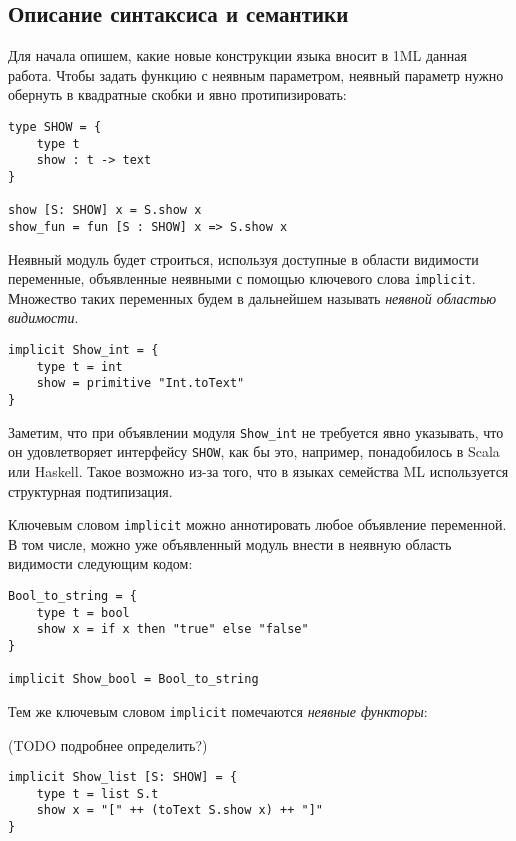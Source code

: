 \documentclass[../diploma.tex]{subfiles}
\begin{document}
\label{sec:1}

\subsection{Описание синтаксиса и семантики}

Для начала опишем, какие новые конструкции языка вносит в 1ML данная работа. Чтобы задать функцию с неявным параметром, неявный параметр нужно обернуть в квадратные скобки и явно протипизировать:

\begin{verbatim}
type SHOW = {
    type t
    show : t -> text
}

show [S: SHOW] x = S.show x
show_fun = fun [S : SHOW] x => S.show x
\end{verbatim}

Неявный модуль будет строиться, используя доступные в области видимости переменные, объявленные неявными с помощью ключевого слова \texttt{implicit}. Множество таких переменных будем в дальнейшем называть \textit{неявной областью видимости}.

\begin{verbatim}
implicit Show_int = {
    type t = int
    show = primitive "Int.toText"
}
\end{verbatim}

Заметим, что при объявлении модуля \texttt{Show\_int} не требуется явно указывать, что он удовлетворяет интерфейсу \texttt{SHOW}, как бы это, например, понадобилось в Scala или Haskell. Такое возможно из-за того, что в языках семейства ML используется структурная подтипизация.

Ключевым словом \texttt{implicit} можно аннотировать любое объявление переменной. В том числе, можно уже объявленный модуль внести в неявную область видимости следующим кодом:

\begin{verbatim}
Bool_to_string = {
    type t = bool
    show x = if x then "true" else "false"
}

implicit Show_bool = Bool_to_string
\end{verbatim}

Тем же ключевым словом \texttt{implicit} помечаются \textit{неявные функторы}:

(TODO подробнее определить?)

\begin{verbatim}
implicit Show_list [S: SHOW] = {
    type t = list S.t
    show x = "[" ++ (toText S.show x) ++ "]"
}
\end{verbatim}
\end{document}
